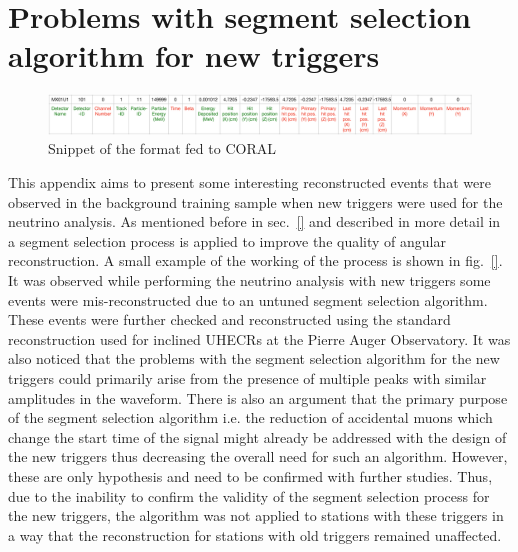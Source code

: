 \chapter{Problems with segment selection algorithm for new triggers} 
\label{sec:app_3}
\begin{figure}[h!]
\centering
\includegraphics[width=18cm]{thesis_figures/TGEANT_format.pdf}
\caption{Snippet of the format fed to CORAL}
\label{fig:Format}
\end{figure}

This appendix aims to present some interesting reconstructed events that were observed in the background training sample when new triggers were used for the neutrino analysis. As mentioned before in sec.~\ref{} and described in more detail in~\cite{} a segment selection process is applied to improve the quality of angular reconstruction. A small example of the working of the process is shown in fig.~\ref{}. It was observed while performing the neutrino analysis with new triggers some events were mis-reconstructed due to an untuned segment selection algorithm. These events were further checked and reconstructed using the standard reconstruction used for inclined UHECRs at the Pierre Auger Observatory. It was also noticed that the problems with the segment selection algorithm for the new triggers could primarily arise from the presence of multiple peaks with similar amplitudes in the waveform. There is also an argument that the primary purpose of the segment selection algorithm i.e. the reduction of accidental muons which change the start time of the signal might already be addressed with the design of the new triggers thus decreasing the overall need for such an algorithm. However, these are only hypothesis and need to be confirmed with further studies. Thus, due to the inability to confirm the validity of the segment selection process for the new triggers, the algorithm was not applied to stations with these triggers in a way that the reconstruction for stations with old triggers remained unaffected. 